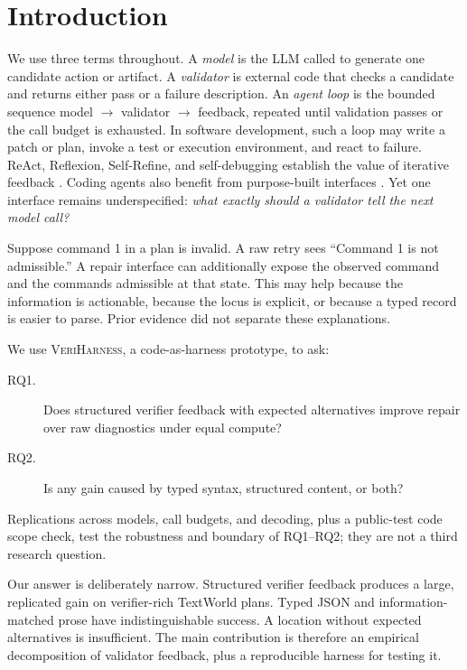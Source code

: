 \documentclass[sigconf,review,anonymous]{acmart}
\newcommand{\vh}{\textsc{VeriHarness}\xspace}
\begin{document}
\maketitle

\section{Introduction}

We use three terms throughout. A \emph{model} is the LLM called to generate one
candidate action or artifact. A \emph{validator} is external code that checks a
candidate and returns either pass or a failure description. An \emph{agent loop}
is the bounded sequence model $\rightarrow$ validator $\rightarrow$ feedback,
repeated until validation passes or the call budget is exhausted. In software
development, such a loop may write a patch or plan, invoke a test or execution
environment, and react to failure. ReAct, Reflexion, Self-Refine, and
self-debugging establish the value of iterative feedback
\cite{yao2023react,shinn2023reflexion,madaan2023selfrefine,chen2024selfdebug}.
Coding agents also benefit from purpose-built interfaces
\cite{yang2024sweagent}. Yet one interface remains underspecified: \emph{what
exactly should a validator tell the next model call?}

Suppose command 1 in a plan is invalid. A raw retry sees ``Command 1 is not
admissible.'' A repair interface can additionally expose the observed command
and the commands admissible at that state. This may help because the information
is actionable, because the locus is explicit, or because a typed record is
easier to parse. Prior evidence did not separate these explanations.

We use \vh, a code-as-harness prototype, to ask:
\begin{description}
  \item[RQ1.] Does structured verifier feedback with expected alternatives improve repair
  over raw diagnostics under equal compute?
  \item[RQ2.] Is any gain caused by typed syntax, structured content, or both?
\end{description}

Replications across models, call budgets, and decoding, plus a public-test code
scope check, test the robustness and boundary of RQ1--RQ2; they are not a third
research question.

Our answer is deliberately narrow. Structured verifier feedback produces a large,
replicated gain on verifier-rich TextWorld plans. Typed JSON and
information-matched prose have indistinguishable success. A location without
expected alternatives is insufficient. The main contribution is therefore an
empirical decomposition of validator feedback, plus a reproducible harness for
testing it.
\end{document}
